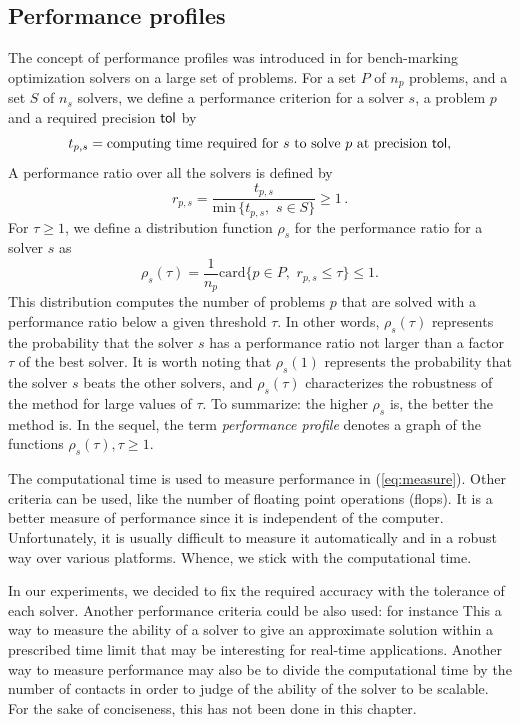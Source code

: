 \subsection{Performance profiles}

The concept of performance profiles was introduced in \citep{Dolan.More_MP2002} for bench-marking optimization solvers on a large set of problems. For a set $P$ of $n_p$ problems, and a set $S$ of $n_s$ solvers, we define a performance criterion for a solver $s$, a problem $p$ and a required precision $\sf tol$ by
\begin{equation}
  \label{eq:measure}
 t_{p,s} = \text{computing time required for}\, \,  s\, \,  \text{to solve}\, \,  p \, \,  \text{at precision } \sf tol, 
\end{equation}
A performance ratio over all the solvers is defined by
\begin{equation}
 r_{p, s} = \frac{t_{p,s}}{\text{min}\, \{t_{p,s}, \, \, s \in S\}} \geq 1 \, .
\end{equation}
For $\tau \geq 1$, we define a  distribution function $\rho_s$ for the performance ratio for a solver $s$ as
\begin{equation}
 \rho_s(\tau) = \frac{1}{n_p} \text{card} \{p \in P, \, \, r_{p, s} \leq \tau\} \leq 1.
\end{equation}
This distribution computes the number of problems $p$ that are solved with a performance ratio below a given threshold $\tau$. In other words, $\rho_s(\tau)$ represents the probability that the solver $s$ has a performance ratio not larger than a factor $\tau$ of the best solver. It is worth noting that $\rho_s(1)$ represents the probability that the solver $s$ beats the other solvers, and $\rho_s(\tau)$ characterizes the robustness of the method for large values of $\tau$.
To summarize: the higher $\rho_s$ is, the better the method is. In the sequel, the term \emph{performance profile} denotes a graph of the functions $\rho_s(\tau), \tau \geq 1$.

The computational time is used to measure performance in (\ref{eq:measure}). 
Other criteria can be used, like the number of floating point operations (flops).
It is a better measure of performance since it is independent of the computer. Unfortunately, it is usually difficult to measure it automatically and in a robust way over various platforms.
Whence, we stick with the computational time.

In our experiments, we decided to fix the required accuracy with the tolerance of each solver.
Another performance criteria could be also used: for instance 
This a way to measure the ability of a solver to give an approximate solution within a prescribed   time limit that may be interesting for real-time applications. Another way to measure performance may also be to divide the computational time by the number of contacts in order to judge of the ability of the solver to be scalable. For the sake of conciseness, this has not been done in this chapter.


